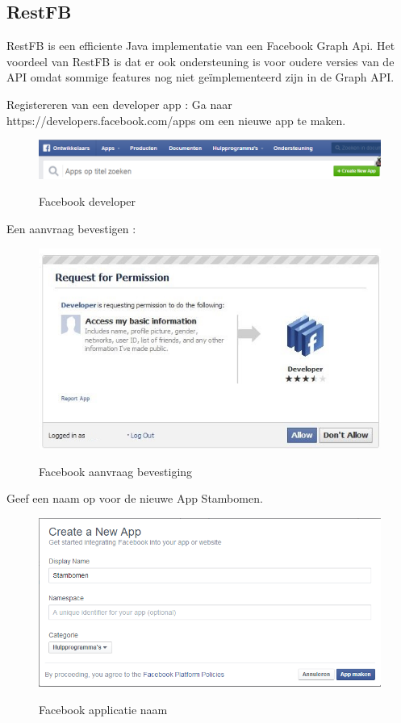 \documentclass[pdftex,a4paper,12pt,twoside]{report}
\begin{document}
\subsection{RestFB}

RestFB is een efficiente Java implementatie van een Facebook Graph Api.
Het voordeel van RestFB is dat er ook ondersteuning is voor oudere versies van de API omdat sommige features nog niet geïmplementeerd zijn in de Graph API.

Registereren van een developer app :
Ga naar https://developers.facebook.com/apps om een nieuwe app te maken.

\begin{figure}[!htb]
 \includegraphics{images/facebook4.png}\\
\caption{Facebook developer}
\end{figure}
 
 Een aanvraag bevestigen : 
 
 \begin{figure}[!htb]
  \includegraphics{images/facebook.png}\\
 \caption{Facebook aanvraag bevestiging}
 \end{figure}
 
 Geef een naam op voor de nieuwe App Stambomen.
 
  \begin{figure}[!htb]
   \includegraphics{images/facebook2.png}\\
  \caption{Facebook applicatie naam}
  \end{figure}
 
\end{document}
